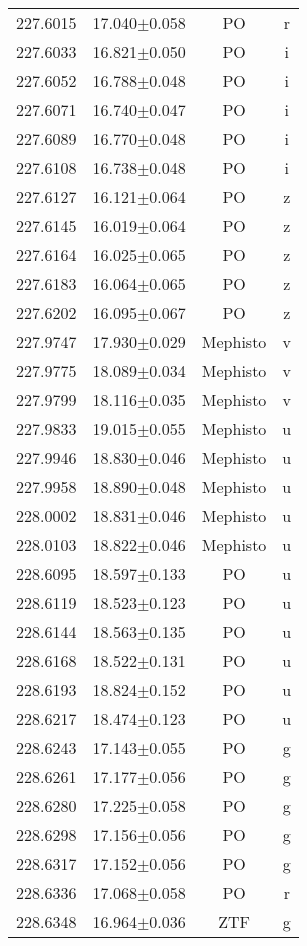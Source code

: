 \begin{table}
\begin{tabular}{cccc}
227.6015 & 17.040$\pm$0.058 & PO & r \\
227.6033 & 16.821$\pm$0.050 & PO & i \\
227.6052 & 16.788$\pm$0.048 & PO & i \\
227.6071 & 16.740$\pm$0.047 & PO & i \\
227.6089 & 16.770$\pm$0.048 & PO & i \\
227.6108 & 16.738$\pm$0.048 & PO & i \\
227.6127 & 16.121$\pm$0.064 & PO & z \\
227.6145 & 16.019$\pm$0.064 & PO & z \\
227.6164 & 16.025$\pm$0.065 & PO & z \\
227.6183 & 16.064$\pm$0.065 & PO & z \\
227.6202 & 16.095$\pm$0.067 & PO & z \\
227.9747 & 17.930$\pm$0.029 & Mephisto & v \\
227.9775 & 18.089$\pm$0.034 & Mephisto & v \\
227.9799 & 18.116$\pm$0.035 & Mephisto & v \\
227.9833 & 19.015$\pm$0.055 & Mephisto & u \\
227.9946 & 18.830$\pm$0.046 & Mephisto & u \\
227.9958 & 18.890$\pm$0.048 & Mephisto & u \\
228.0002 & 18.831$\pm$0.046 & Mephisto & u \\
228.0103 & 18.822$\pm$0.046 & Mephisto & u \\
228.6095 & 18.597$\pm$0.133 & PO & u \\
228.6119 & 18.523$\pm$0.123 & PO & u \\
228.6144 & 18.563$\pm$0.135 & PO & u \\
228.6168 & 18.522$\pm$0.131 & PO & u \\
228.6193 & 18.824$\pm$0.152 & PO & u \\
228.6217 & 18.474$\pm$0.123 & PO & u \\
228.6243 & 17.143$\pm$0.055 & PO & g \\
228.6261 & 17.177$\pm$0.056 & PO & g \\
228.6280 & 17.225$\pm$0.058 & PO & g \\
228.6298 & 17.156$\pm$0.056 & PO & g \\
228.6317 & 17.152$\pm$0.056 & PO & g \\
228.6336 & 17.068$\pm$0.058 & PO & r \\
228.6348 & 16.964$\pm$0.036 & ZTF & g \\

\end{tabular}
\end{table}
